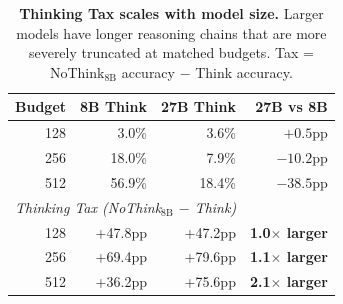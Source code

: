 \begin{table}[t]
\centering
\caption{\textbf{Thinking Tax scales with model size.} Larger models have longer reasoning chains that are more severely truncated at matched budgets. Tax = NoThink$_\text{8B}$ accuracy $-$ Think accuracy.}
\label{tab:model-size-scaling-updated}
\small
\begin{tabular}{r rr r}
\toprule
\textbf{Budget} & \textbf{8B Think} & \textbf{27B Think} & \textbf{27B vs 8B} \\
\midrule
128 & 3.0\% & 3.6\% & $+0.5$pp \\
256 & 18.0\% & 7.9\% & $-10.2$pp \\
512 & 56.9\% & 18.4\% & $-38.5$pp \\
\midrule
\multicolumn{4}{l}{\textit{Thinking Tax (NoThink$_\text{8B}$ $-$ Think)}} \\
\midrule
128 & +47.8pp & +47.2pp & \textbf{1.0$\times$ larger} \\
256 & +69.4pp & +79.6pp & \textbf{1.1$\times$ larger} \\
512 & +36.2pp & +75.6pp & \textbf{2.1$\times$ larger} \\
\bottomrule
\end{tabular}
\end{table}
